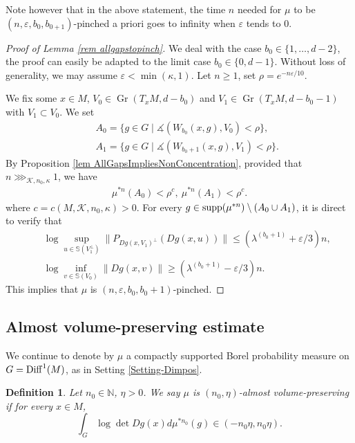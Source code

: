 \documentclass[11pt, leqno, fleqn]{amsart}
\def\eps{\varepsilon}
\newcommand{\margem}[1]{\marginpar{{\scriptsize {#1}}}}
\def\clo{   \color{orange}}
\def \N{{\mathbb N}}
\DeclareMathOperator{\Gr}{Gr}
\newcommand{\cK}{{\mathcal K}}
\newcommand{\aryst}{\begin{eqnarray*}}
\newcommand{\earyst}{\end{eqnarray*}}
\newtheorem{defi}[thm]{\bf Definition}
\theoremstyle{definition}
\theoremstyle{definition}
\def\supp{{\rm supp}}
\def\S{ {\mathbb{S}} }
\newcommand{\Diff}{{\rm Diff}}
\begin{document}
Note  however that in the above statement, the time $n$ needed for $\mu$ to be $(n, \eps, b_{0},b_{0+1})$-pinched a priori goes to infinity when $\eps$ tends to $0$.
	



		 
		 \begin{proof}[Proof of Lemma \ref{rem allgapstopinch}] 
		 	We deal with the case  $b_{0}\in \{1, \dots, d-2\}$, the proof can easily be adapted to the limit case $b_{0}\in \{0, d-1\}$. Without loss of generality, we may assume  $\eps < \min(\kappa, 1) $.
		 Let $n \geq 1$, set  $\rho = e^{- n \eps/10}$.
		 	
		 	We fix some  $x \in M$,  $V_0 \in \Gr(T_xM, d - b_0)$ and  $V_1 \in \Gr(T_xM,  d - b_0 - 1)$ with $V_1 \subset V_0$.
		 	We set 
		 	\aryst
		 	&& A_0 = \{ g \in G \mid  \measuredangle(  W_{b_0}(x, g), V_0) < \rho \}, \\
		 	&& A_1 = \{ g \in G \mid  \measuredangle(  W_{b_0+1}(x, g), V_1) < \rho \}.
		 	\earyst
		 	By Proposition \ref{lem AllGapsImpliesNonConcentration},  provided that $n  \ggg_{\cK, n_{0}, \kappa} 1$, we have
		 	\aryst
		 		\mu^{*n}( A_0 ) < \rho^{c}, \
		 		\mu^{*n}( A_1 ) < \rho^{c}.
		 	\earyst
			where $c=c( M,  \cK, n_{0}, \kappa)>0$. 
		 	For every $g \in \supp(\mu^{* n}) \setminus (A_0 \cup A_1)$, it is direct to verify that 
		 	\aryst 
		 	&&	    \log \sup_{u \in \S( V_1^{\perp})}  \| P_{   Dg(x, V_1)^{\perp}}(  Dg(x, u) ) \|   \leq ( \lambda^{(b_0 + 1)}  + \eps  / 3 ) n,   \\
		 	&&	 	  \log \inf_{v \in \S(V_0)}  \| Dg(x, v) \|       \geq  ( \lambda^{(b_0 + 1)}  - \eps  / 3 )n.
		 	\earyst
		 	This implies that $\mu$ is  $(n, \eps, b_0, b_0 + 1)$-pinched.
		 \end{proof}
		 
		 
		 
		 
		 
\subsection{Almost volume-preserving estimate} 
We continue to denote by $\mu$ a compactly supported Borel probability measure on $G=\Diff^1(M)$, as in Setting \ref{Setting-Dimpos}. 

\begin{defi} 
Let $n_{0}\in \N$, $\eta>0$. We say $\mu$ is $(n_{0},\eta)$-almost volume-preserving if for every $x\in M$, 
$$\int_{G}\log \det Dg(x) d\mu^{*n_{0}}(g) \in (-n_{0}\eta, n_{0}\eta). $$
\end{defi}
\end{document}
